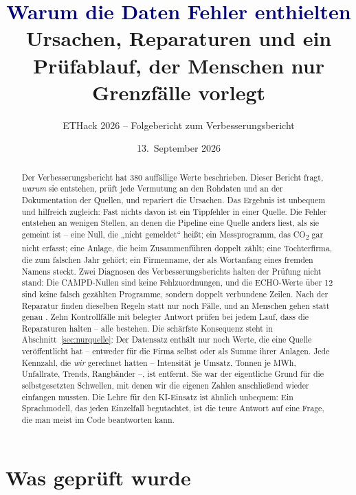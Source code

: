 \documentclass[11pt,a4paper]{article}
\title{\textcolor{navy}{Warum die Daten Fehler enthielten}\\[4mm]
\large Ursachen, Reparaturen und ein Prüfablauf, der Menschen nur Grenzfälle vorlegt}
\author{ETHack 2026 -- Folgebericht zum Verbesserungsbericht}
\date{13.~September 2026}
\begin{document}
\maketitle

\begin{abstract}
\noindent
Der Verbesserungsbericht hat 380 auffällige Werte beschrieben. Dieser Bericht fragt, \emph{warum} sie entstehen, prüft jede Vermutung an den Rohdaten und an der Dokumentation der Quellen, und repariert die Ursachen. Das Ergebnis ist unbequem und hilfreich zugleich: Fast nichts davon ist ein Tippfehler in einer Quelle. Die Fehler entstehen an wenigen Stellen, an denen die Pipeline eine Quelle anders liest, als sie gemeint ist -- eine Null, die „nicht gemeldet“ heißt; ein Messprogramm, das CO\textsubscript{2} gar nicht erfasst; eine Anlage, die beim Zusammenführen doppelt zählt; eine Tochterfirma, die zum falschen Jahr gehört; ein Firmenname, der als Wortanfang eines fremden Namens steckt. Zwei Diagnosen des Verbesserungsberichts halten der Prüfung nicht stand: Die CAMPD-Nullen sind keine Fehlzuordnungen, und die ECHO-Werte über 12 sind keine falsch gezählten Programme, sondern doppelt verbundene Zeilen. Nach der Reparatur finden dieselben Regeln statt \vorFlags{} nur noch \statFlags{} Fälle, und an Menschen gehen statt \vorMensch{} genau \kiMensch. Zehn Kontrollfälle mit belegter Antwort prüfen bei jedem Lauf, dass die Reparaturen halten -- alle \repBehoben{} bestehen. Die schärfste Konsequenz steht in Abschnitt~\ref{sec:nurquelle}: Der Datensatz enthält nur noch Werte, die eine Quelle veröffentlicht hat -- entweder für die Firma selbst oder als Summe ihrer Anlagen. Jede Kennzahl, die \emph{wir} gerechnet hatten -- Intensität je Umsatz, Tonnen je MWh, Unfallrate, Trends, Rangbänder --, ist entfernt. Sie war der eigentliche Grund für die selbstgesetzten Schwellen, mit denen wir die eigenen Zahlen anschließend wieder einfangen mussten. Die Lehre für den KI-Einsatz ist ähnlich unbequem: Ein Sprachmodell, das jeden Einzelfall begutachtet, ist die teure Antwort auf eine Frage, die man meist im Code beantworten kann.
\end{abstract}

\tableofcontents
\newpage

\section{Was geprüft wurde}
\label{sec:ueberblick}
\end{document}
